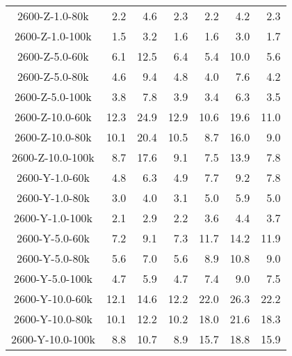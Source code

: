 \begin{longtable}{crrrrrr}
      2600-Z-1.0-80k &         2.2 &         4.6 &         2.3 &            2.2 &            4.2 &            2.3 \\
      2600-Z-1.0-100k &         1.5 &         3.2 &         1.6 &            1.6 &            3.0 &            1.7 \\
      2600-Z-5.0-60k &         6.1 &        12.5 &         6.4 &            5.4 &           10.0 &            5.6 \\
      2600-Z-5.0-80k &         4.6 &         9.4 &         4.8 &            4.0 &            7.6 &            4.2 \\
      2600-Z-5.0-100k &         3.8 &         7.8 &         3.9 &            3.4 &            6.3 &            3.5 \\
      2600-Z-10.0-60k &        12.3 &        24.9 &        12.9 &           10.6 &           19.6 &           11.0 \\
      2600-Z-10.0-80k &        10.1 &        20.4 &        10.5 &            8.7 &           16.0 &            9.0 \\
      2600-Z-10.0-100k &         8.7 &        17.6 &         9.1 &            7.5 &           13.9 &            7.8 \\
      2600-Y-1.0-60k &         4.8 &         6.3 &         4.9 &            7.7 &            9.2 &            7.8 \\
      2600-Y-1.0-80k &         3.0 &         4.0 &         3.1 &            5.0 &            5.9 &            5.0 \\
      2600-Y-1.0-100k &         2.1 &         2.9 &         2.2 &            3.6 &            4.4 &            3.7 \\
      2600-Y-5.0-60k &         7.2 &         9.1 &         7.3 &           11.7 &           14.2 &           11.9 \\
      2600-Y-5.0-80k &         5.6 &         7.0 &         5.6 &            8.9 &           10.8 &            9.0 \\
      2600-Y-5.0-100k &         4.7 &         5.9 &         4.7 &            7.4 &            9.0 &            7.5 \\
      2600-Y-10.0-60k &        12.1 &        14.6 &        12.2 &           22.0 &           26.3 &           22.2 \\
      2600-Y-10.0-80k &        10.1 &        12.2 &        10.2 &           18.0 &           21.6 &           18.3 \\
      2600-Y-10.0-100k &         8.8 &        10.7 &         8.9 &           15.7 &           18.8 &           15.9 \\

\end{longtable}
